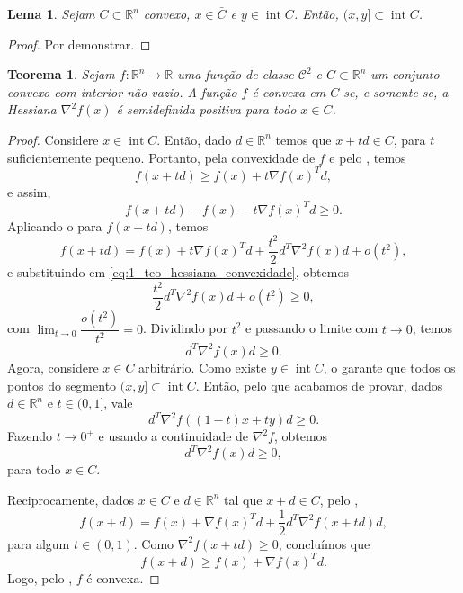 \documentclass[12pt,a4paper]{scrartcl}
\DeclareMathOperator{\interior}{int}
\def\RR{\mathds{R}}
\newtheorem{teo}{Teorema}
\newtheorem{lema}{Lema}
\theoremstyle{definition}%
\begin{document}
\begin{lema} \label{lema:auxiliar_para_teo_hessiana_convexidade}
Sejam $C \subset \RR^{n}$ convexo, $x \in \bar{C}$ e $y \in \interior C$. Então, $(x,y] \subset \interior C$.
\end{lema}
\begin{proof}
Por demonstrar.
\end{proof}

\begin{teo} \label{teo:hessiana_convexidade}
Sejam $f:\RR^{n} \rightarrow \RR $ uma função de classe $\mathcal{C}^{2}$ e $C \subset \RR^{n}$ um conjunto convexo com interior não vazio. A função $f$ é convexa em $C$ se, e somente se, a Hessiana $\nabla^{2} f(x)$ é semidefinida positiva para todo $x \in C$.
\end{teo}
\begin{proof}
Considere $x \in \interior C$. Então, dado $d \in \RR^{n}$ temos que $x+td \in C$, para $t$ suficientemente pequeno. Portanto, pela convexidade de $f$ e pelo , temos
\[
f(x+td) \geq f(x) + t\nabla f(x)^{T} d ,
\]
e assim, 
\[ \label{eq:1_teo_hessiana_convexidade}
f(x+td) -f(x) - t\nabla f(x)^{T} d \geq 0 . 
\]
Aplicando o  para $f(x+td)$, temos
\[
f(x+td) = f(x) + t\nabla f(x)^{T}d + \dfrac{t^{2}}{2}d^{T} \nabla^{2} f(x)d + o(t^{2}) ,
\]
e substituindo em \eqref{eq:1_teo_hessiana_convexidade}, obtemos
\[
\dfrac{t^{2}}{2}d^{T} \nabla^{2} f(x)d + o(t^{2}) \geq 0 ,
\]
com $\lim_{t \rightarrow 0} \dfrac{o(t^{2})}{t^{2}} = 0$. 
Dividindo por $t^{2}$ e passando o limite com $t \rightarrow 0$, temos
\[
d^{T} \nabla^{2} f(x)d \geq 0 .
\]
Agora, considere $x \in C$ arbitrário. Como existe $y \in \interior C$, o  garante que todos os pontos do segmento $(x,y] \subset \interior C$. Então, pelo que acabamos de provar, dados $d \in \RR^{n}$ e $t\in (0,1]$, vale
\[
d^{T} \nabla^{2} f((1-t)x+ty)d \geq 0 .
\]
Fazendo $t \rightarrow 0^{+}$ e usando a continuidade de $\nabla^{2} f$, obtemos
\[
d^{T} \nabla^{2} f(x)d \geq 0,
\]
para todo $x \in C$.

Reciprocamente, dados $x \in C$ e $d \in \RR^{n}$ tal que $x+d \in C$, pelo ,
\[
f(x+d) = f(x) + \nabla f(x)^{T}d + \dfrac{1}{2}d^{T} \nabla^{2} f(x+td)d,
\]
para algum $t \in (0,1)$. Como $\nabla ^{2}f(x+td) \geq 0$, concluímos que 
\[
f(x+d) \geq f(x) + \nabla f(x)^{T}d .
\]
Logo, pelo , $f$ é convexa.
\end{proof}
\end{document}
